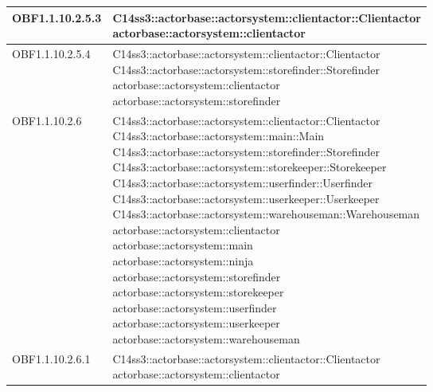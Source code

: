 \documentclass{scalatekids-article}
\begin{document}
\begin{longtable}[H]{|p{4.5cm}|p{13cm}|}
\hline
OBF1.1.10.2.5.3 & \multiLineCell[t]{C14ss3::actorbase::actorsystem::clientactor::Clientactor\\actorbase::actorsystem::clientactor\\}\\
\hline
OBF1.1.10.2.5.4 & \multiLineCell[t]{C14ss3::actorbase::actorsystem::clientactor::Clientactor\\C14ss3::actorbase::actorsystem::storefinder::Storefinder\\actorbase::actorsystem::clientactor\\actorbase::actorsystem::storefinder\\}\\
\hline
OBF1.1.10.2.6 & \multiLineCell[t]{C14ss3::actorbase::actorsystem::clientactor::Clientactor\\C14ss3::actorbase::actorsystem::main::Main\\C14ss3::actorbase::actorsystem::storefinder::Storefinder\\C14ss3::actorbase::actorsystem::storekeeper::Storekeeper\\C14ss3::actorbase::actorsystem::userfinder::Userfinder\\C14ss3::actorbase::actorsystem::userkeeper::Userkeeper\\C14ss3::actorbase::actorsystem::warehouseman::Warehouseman\\actorbase::actorsystem::clientactor\\actorbase::actorsystem::main\\actorbase::actorsystem::ninja\\actorbase::actorsystem::storefinder\\actorbase::actorsystem::storekeeper\\actorbase::actorsystem::userfinder\\actorbase::actorsystem::userkeeper\\actorbase::actorsystem::warehouseman\\}\\
\hline
OBF1.1.10.2.6.1 & \multiLineCell[t]{C14ss3::actorbase::actorsystem::clientactor::Clientactor\\actorbase::actorsystem::clientactor\\}\\
\hline

\end{longtable}
\end{document}
